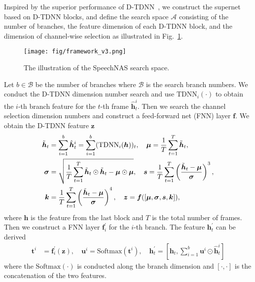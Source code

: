 \documentclass{article}
\begin{document}
Inspired by the superior performance of D-TDNN~\cite{yu2020densely}, we construct the supernet based on D-TDNN blocks, and define the search space $\mathcal{A}$ consisting of the number of branches, the feature dimension of each D-TDNN block, and the dimension of channel-wise selection as illustrated in Fig.~\ref{fig:search_space}.
\begin{figure}[t]
\begin{minipage}[b]{1.0\linewidth}
  \centering
  \centerline{\texttt{[image: fig/framework\_v3.png]}}
\end{minipage}
\caption{The illustration of the SpeechNAS search space.}
\label{fig:search_space}
\end{figure}

Let $b \in \mathcal{B}$ be the number of branches where $\mathcal{B}$ is the search branch numbers. We conduct the D-TDNN dimension number search and use $\text{TDNN}_i(\cdot)$ to obtain the $i$-th branch feature for the $t$-th frame $\hat{\bm{h}}^i_t$. Then we search the channel selection dimension numbers and construct a feed-forward net (FNN) layer $\bm{f}$. We obtain the D-TDNN feature $\bm{z}$
\begin{equation}
    \begin{aligned}
    \Tilde{\bm{h}}_t &= \sum_{i=1}^{b} \hat{\bm{h}}^i_t = \sum_{i=1}^{b} (\text{TDNN}_i(\bm{h}))_t, \quad \bm{\mu} = \frac{1}{T} \sum_{t=1}^{T} \Tilde{\bm{h}}_t, \\
    \bm{\sigma} &= \sqrt{\frac{1}{T} \sum_{t=1}^{T} \Tilde{\bm{h}}_t \odot \Tilde{\bm{h}}_t - \bm{\mu} \odot \bm{\mu}}, \quad \bm{s} = \frac{1}{T}\sum_{t=1}^{T} \left(\frac{\Tilde{\bm{h}}_t - \bm{\mu}}{\bm{\sigma}}\right)^3, \\
    \bm{k} &= \frac{1}{T}\sum_{t=1}^{T} \left(\frac{\Tilde{\bm{h}}_t - \bm{\mu}}{\bm{\sigma}}\right)^4, \quad \bm{z} = \bm{f}([\bm{\mu}, \bm{\sigma}, \bm{s}, \bm{k}]),
    \end{aligned}
\end{equation}
where $\bm{h}$ is the feature from the last block and $T$ is the total number of frames. Then we construct a FNN layer $\bm{f}_i^{\prime}$ for the $i$-th branch. The feature $\bm{h}_t^{\prime}$ can be derived
\begin{equation}
    \begin{aligned}
    \bm{t}^i &= \bm{f}_i^{\prime}(\bm{z}), \quad \bm{u}^i = \text{Softmax}(\bm{t}^i), \quad \bm{h}_t^{\prime} = [\bm{h}_t, \sum_{i=1}^{b} \bm{u}^i \odot \hat{\bm{h}}_t^{i} ]
    \end{aligned}
\end{equation}
where the $\text{Softmax}(\cdot)$ is conducted along the branch dimension and $[\cdot, \cdot]$ is the concatenation of the two features.
\end{document}

